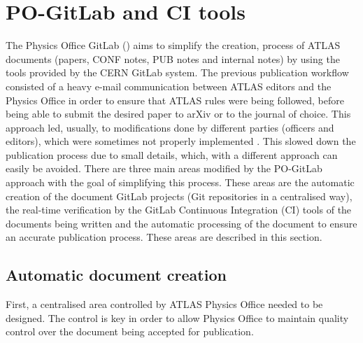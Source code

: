 
\section{PO-GitLab and CI tools}%
\label{sec:PO-Gitlab_and_CI_tools}

The Physics Office GitLab  (\pogitlab) aims to simplify the creation,
 process of ATLAS documents (papers, CONF notes, PUB notes and internal notes) by using the tools provided by the CERN GitLab system.
The previous publication workflow consisted of a heavy e-mail communication between ATLAS editors and the Physics Office in order to ensure that ATLAS rules were being followed, before being able to submit the desired paper to arXiv or to the journal of choice.
This approach led, usually, to modifications done by different parties (officers and editors), which were sometimes not properly implemented .
This slowed down the publication process due to small details, which, with a different approach can easily be avoided.
There are three main areas modified by the PO-GitLab approach with the goal of simplifying this process. These areas are the automatic creation of the document GitLab projects (Git repositories in a centralised way), the real-time verification by the GitLab Continuous Integration (CI) tools of the documents being written and the automatic processing of the document to ensure an accurate publication process. These areas are described in this section.


\subsection{Automatic document creation}%
\label{sec:Automatic_document_creation}

First, a centralised area controlled by ATLAS Physics Office needed to be designed.
The control is key in order to allow Physics Office to maintain quality control over the document being accepted for publication.

